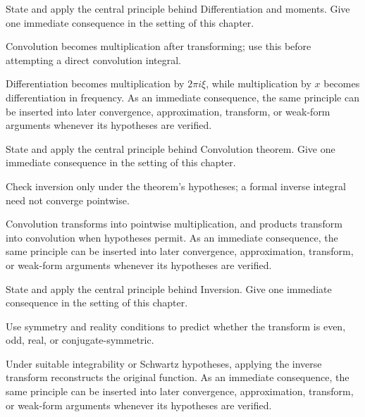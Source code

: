 \begin{exercise}\label{exr:iii11-06}
State and apply the central principle behind Differentiation and moments. Give one immediate consequence in the setting of this chapter.
\end{exercise}
\begin{hint}
Convolution becomes multiplication after transforming; use this before attempting a direct convolution integral.
\end{hint}
\begin{solution}
Differentiation becomes multiplication by $2\pi i\xi$, while multiplication by $x$ becomes differentiation in frequency. As an immediate consequence, the same principle can be inserted into later convergence, approximation, transform, or weak-form arguments whenever its hypotheses are verified.
\end{solution}

\begin{exercise}\label{exr:iii11-07}
State and apply the central principle behind Convolution theorem. Give one immediate consequence in the setting of this chapter.
\end{exercise}
\begin{hint}
Check inversion only under the theorem's hypotheses; a formal inverse integral need not converge pointwise.
\end{hint}
\begin{solution}
Convolution transforms into pointwise multiplication, and products transform into convolution when hypotheses permit. As an immediate consequence, the same principle can be inserted into later convergence, approximation, transform, or weak-form arguments whenever its hypotheses are verified.
\end{solution}

\begin{exercise}\label{exr:iii11-08}
State and apply the central principle behind Inversion. Give one immediate consequence in the setting of this chapter.
\end{exercise}
\begin{hint}
Use symmetry and reality conditions to predict whether the transform is even, odd, real, or conjugate-symmetric.
\end{hint}
\begin{solution}
Under suitable integrability or Schwartz hypotheses, applying the inverse transform reconstructs the original function. As an immediate consequence, the same principle can be inserted into later convergence, approximation, transform, or weak-form arguments whenever its hypotheses are verified.
\end{solution}


